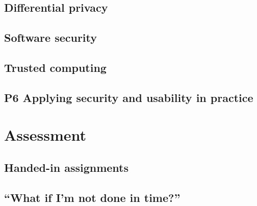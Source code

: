 \subsection{Differential privacy}%
\label{diffpriv}


\subsection{Software security}%
\label{software}


\subsection{Trusted computing}%
\label{trustcomp}


\subsection{P6 Applying security and usability in practice}%
\label{devel}



\section{Assessment}%
\label{Assessment}


\subsection{Handed-in assignments}


\subsection{\enquote{What if I'm not done in time?}}%
\label{sec:late}



\printbibliography{}
